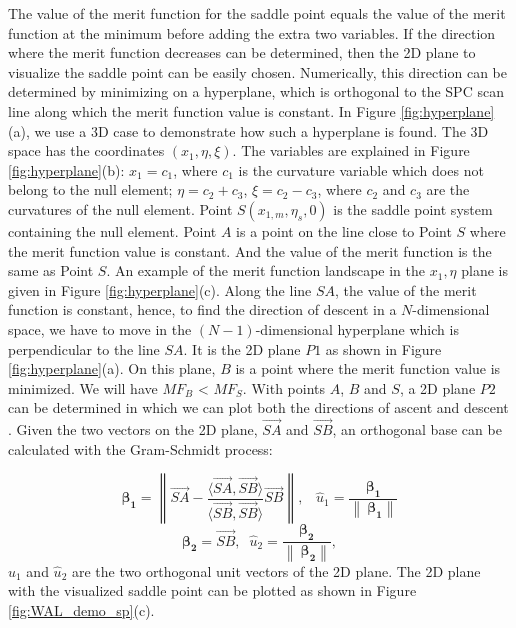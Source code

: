 The value of the merit function for the saddle point equals the value of the merit function at the minimum before adding the extra two variables. If the direction where the merit function decreases can be determined, then the 2D plane to visualize the saddle point can be easily chosen. Numerically, this direction can be determined by minimizing on a hyperplane, which is orthogonal to the SPC scan line along which the merit function value is constant. In Figure \ref{fig:hyperplane}(a), we use a 3D case to demonstrate how such a hyperplane is found. The 3D space has the coordinates $(x_1, \eta, \xi)$. The variables are explained in Figure \ref{fig:hyperplane}(b): $x_1 = c_1$, where $c_1$ is the curvature variable which does not belong to the null element; $\eta = c_2 + c_3$, $\xi = c_2 - c_3$, where $c_2$ and $c_3$ are the curvatures of the null element.  Point $S (x_{1,m}, \eta_{s}, 0)$ is the saddle point system containing the null element. Point $A$ is a point on the line close to Point $S$ where the merit function value is constant. And the value of the merit function is the same as Point $S$. An example of the merit function landscape in the $x_1, \eta$ plane is given in Figure \ref{fig:hyperplane}(c). Along the line $SA$, the value of the merit function is constant, hence, to find the direction of descent in a $N$-dimensional space, we have to move in the $(N-1)$-dimensional hyperplane which is perpendicular to the line $SA$. It is the 2D plane $P1$ as shown in Figure \ref{fig:hyperplane}(a). On this plane, $B$ is a point where the merit function value is minimized. We will have $MF_{B}$ < $MF_{S}$. With points $A$, $B$ and $S$, a 2D plane $P2$ can be determined in which we can plot both the directions of ascent and descent . Given the two vectors on the 2D plane, $\overrightarrow{SA}$ and $\overrightarrow{SB}$, an orthogonal base can be calculated with the Gram-Schmidt process:

\setlength{\belowdisplayshortskip}{5pt}
\setlength{\abovedisplayshortskip}{5pt}
\begin{equation} \label{eq:u1}
\pmb{\beta_{1}} =  \left\| \overrightarrow{SA}-{\frac{\langle \overrightarrow{SA},\overrightarrow{SB}\rangle}{\langle \overrightarrow{SB},\overrightarrow{SB}\rangle}}\overrightarrow{SB} \right\|,  \; \; \; \hat{u}_{1} = \frac{\pmb{\beta_{1}}}{\left\|\ \pmb{\beta_{1}}\right\|}
\end{equation}
\setlength{\belowdisplayshortskip}{10pt}
\begin{equation} \label{eq:u2}
\pmb{\beta_{2}} = \overrightarrow{SB}, \;\; 
\hat{u}_{2} =\frac{\pmb{\beta_{2}}}{\left\|\ \pmb{\beta_{2}}\right\|} ,
\end{equation}
 $\hat{u}_{1}$ and $\hat{u}_{2}$  are the two orthogonal unit vectors of the 2D plane. The 2D plane with the visualized saddle point can be plotted as shown in Figure \ref{fig:WAL_demo_sp}(c).

